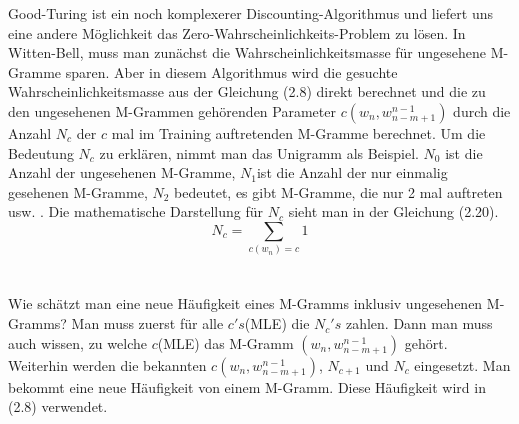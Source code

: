 Good-Turing ist ein noch komplexerer Discounting-Algorithmus und liefert uns eine andere M\"oglichkeit  das Zero-Wahrscheinlichkeits-Problem zu l\"osen. In Witten-Bell, muss man zun\"achst die Wahrscheinlichkeitsmasse f\"ur ungesehene M-Gramme sparen. Aber in diesem Algorithmus wird die gesuchte Wahrscheinlichkeitsmasse aus der Gleichung (2.8) direkt berechnet und die zu den ungesehenen M-Grammen geh\"orenden Parameter $c(w_{n},w_{n-m+1}^{n-1})$ durch die Anzahl $N_{c}$ der  $c$ mal im Training auftretenden M-Gramme berechnet. Um die Bedeutung $N_{c}$ zu erkl\"aren, nimmt man das Unigramm als Beispiel. $N_{0}$ ist die Anzahl der ungesehenen M-Gramme, $N_{1}$ist die Anzahl der nur einmalig gesehenen M-Gramme, $N_{2}$ bedeutet, es gibt  M-Gramme, die nur 2 mal auftreten usw. . Die mathematische Darstellung f\"ur $N_{c}$ sieht man in der Gleichung (2.20).
\begin{equation}
N_{c}=\sum_{c(w_{n})=c}1
\end{equation}
\\
\\
Wie sch\"atzt man eine neue H\"aufigkeit eines M-Gramms inklusiv ungesehenen M-Gramms? Man muss zuerst f\"ur alle $c's$(MLE) die $N_{c}'s$ zahlen. Dann man muss auch wissen, zu welche $c$(MLE) das M-Gramm $(w_{n},w_{n-m+1}^{n-1})$  geh\"ort. Weiterhin werden die bekannten $c(w_{n},w_{n-m+1}^{n-1})$, $N_{c+1}$ und $N_{c}$ eingesetzt. Man bekommt eine neue H\"aufigkeit von einem M-Gramm. Diese H\"aufigkeit wird in (2.8) verwendet.

